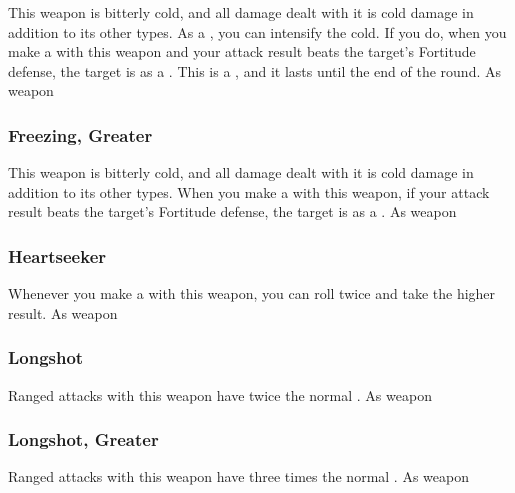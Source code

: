 This weapon is bitterly cold, and all damage dealt with it is cold damage in addition to its other types.
As a , you can intensify the cold.
If you do, when you make a  with this weapon and your attack result beats the target's Fortitude defense, the target is \fatigued as a .
This is a , and it lasts until the end of the round.
 
 As weapon
\lowercase{\hypertarget{item:Freezing, Greater}{}}\label{item:Freezing, Greater}
\hypertarget{item:Freezing, Greater}{\subsubsection{Freezing, Greater\hfill{}}}
This weapon is bitterly cold, and all damage dealt with it is cold damage in addition to its other types.
When you make a  with this weapon, if your attack result beats the target's Fortitude defense, the target is \fatigued as a .
 
 As weapon
\lowercase{\hypertarget{item:Heartseeker}{}}\label{item:Heartseeker}
\hypertarget{item:Heartseeker}{\subsubsection{Heartseeker\hfill{}}}
Whenever you make a  with this weapon, you can roll twice and take the higher result.
 
 As weapon
\lowercase{\hypertarget{item:Longshot}{}}\label{item:Longshot}
\hypertarget{item:Longshot}{\subsubsection{Longshot\hfill{}}}
Ranged attacks with this weapon have twice the normal .
 
 As weapon
\lowercase{\hypertarget{item:Longshot, Greater}{}}\label{item:Longshot, Greater}
\hypertarget{item:Longshot, Greater}{\subsubsection{Longshot, Greater\hfill{}}}
Ranged attacks with this weapon have three times the normal .
 
 As weapon
\lowercase{\hypertarget{item:Merciful}{}}\label{item:Merciful}
